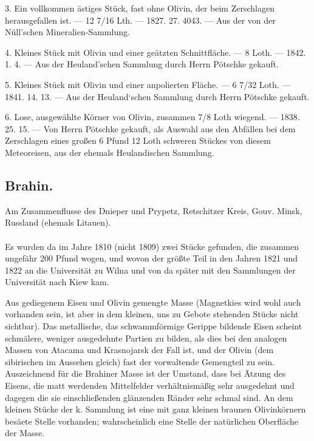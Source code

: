 \documentclass[a4paper, 11pt, oneside, polutonikogreek, german]{article}
\begin{document}
3. Ein vollkommen ästiges Stück, fast ohne Olivin, der beim Zerschlagen herausgefallen ist. — 12 7/16 Lth. — 1827. 27. 4043. — Aus der von der Nüll'schen Mineralien-Sammlung.

4. Kleines Stück mit Olivin und einer geätzten Schnittfläche. — 8 Loth. — 1842. 1. 4. — Aus der Heuland'schen Sammlung durch Herrn Pötschke gekauft.

5. Kleines Stück mit Olivin und einer anpolierten Fläche. — 6 7/32 Loth. — 1841. 14. 13. — Aus der Heuland‘schen Sammlung durch Herrn Pötschke gekauft.

6. Lose, ausgewählte Körner von Olivin, zusammen 7/8 Loth wiegend. — 1838. 25. 15. — Von Herrn Pötschke gekauft, als Auswahl aus den Abfällen bei dem Zerschlagen eines großen 6 Pfund 12 Loth schweren Stückes von diesem Meteoreisen, aus der ehemals Heulandischen Sammlung.
\subsection{Brahin.}
\begin{center}
\small
Am Zusammenflusse des Dnieper und Prypetz, Retschitzer Kreis, Gouv. Minsk, Russland (ehemals Litauen).
\end{center}
\paragraph{}
Es wurden da im Jahre 1810 (nicht 1809) zwei Stücke gefunden, die zusammen ungefähr 200 Pfund wogen, und wovon der größte Teil in den Jahren 1821 und 1822 an die Universität zu Wilna und von da später mit den Sammlungen der Universität nach Kiew kam.

Aus gediegenem Eisen und Olivin gemengte Masse (Magnetkies wird wohl auch vorhanden sein, ist aber in dem kleinen, uns zu Gebote stehenden Stücke nicht sichtbar). Das metallische, das schwammförmige Gerippe bildende Eisen scheint schmälere, weniger ausgedehnte Partien zu bilden, als dies bei den analogen Massen von Atacama und Krasnojarsk der Fall ist, und der Olivin (dem sibirischen im Aussehen gleich) fast der vorwaltende Gemengteil zu sein. Auszeichnend für die Brahiner Masse ist der Umstand, dass bei Ätzung des Eisens, die matt werdenden Mittelfelder verhältnismäßig sehr ausgedehnt und dagegen die sie einschließenden glänzenden Ränder sehr schmal sind. An dem kleinen Stücke der k. Sammlung ist eine mit ganz kleinen braunen Olivinkörnern besäete Stelle vorhanden; wahrscheinlich eine Stelle der natürlichen Oberfläche der Masse.
\end{document}
